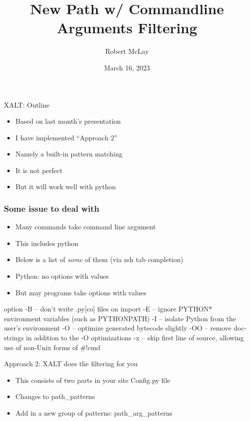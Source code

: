 \documentclass{beamer}
\begin{document}
\title[XALT]{New Path w/ Commandline Arguments Filtering}
\author{Robert McLay}
\date{March 16, 2023}

\frame{\titlepage}

\begin{frame}{XALT: Outline}
  \begin{itemize}
    \item Based on last month's presentation
    \item I have implemented ``Approach 2''
    \item Namely a built-in pattern matching
    \item It is not perfect
    \item But it will work well with python
  \end{itemize}
\end{frame}

\begin{frame}[fragile]
    \frametitle{Some issue to deal with}
  \begin{itemize}
    \item Many commands take command line argument
    \item This includes python
    \item Below is a list of \emph{some} of them (via zsh tab completion)
    \item Python: no options with values
    \item But may programs take options with values
  \end{itemize}
 {\tiny
    \begin{semiverbatim}
option
-B   -- don't write .py[co] files on import
-E   -- ignore PYTHON* environment variables (such as PYTHONPATH)
-I   -- isolate Python from the user's environment
-O   -- optimize generated bytecode slightly
-OO  -- remove doc-strings in addition to the -O optimizations
-x   -- skip first line of source, allowing use of non-Unix forms of #!cmd
    \end{semiverbatim}
}

\end{frame}

\begin{frame}{Approach 2: XALT does the filtering for you}
  \begin{itemize}
    \item This consists of two parts in your site Config.py file
    \item Changes to path\_patterns
    \item Add in a new group of patterns: path\_arg\_patterns
  \end{itemize}
\end{frame}
\end{document}
